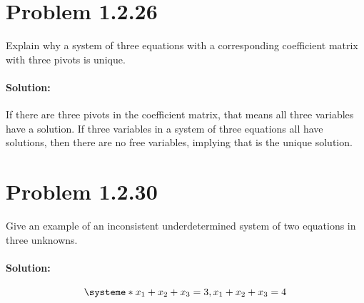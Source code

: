 \documentclass[11pt, notitlepage]{report}
\newenvironment{solution}{\paragraph{Solution:}}{\hfill}
\begin{document}
\newpage
\section{Problem 1.2.26}

Explain why a system of three equations with a corresponding coefficient matrix with three pivots is unique.

\begin{solution}
If there are three pivots in the coefficient matrix, that means all three variables have a solution. If three variables in a system of three equations all have solutions, then there are no free variables, implying that is the unique solution.
\end{solution}

\section{Problem 1.2.30}

Give an example of an inconsistent underdetermined system of two equations in three unknowns.

\begin{solution}

\[
\systeme*{x_1+x_2+x_3=3, x_1+x_2+x_3=4}
\]

\end{solution}
\end{document}
